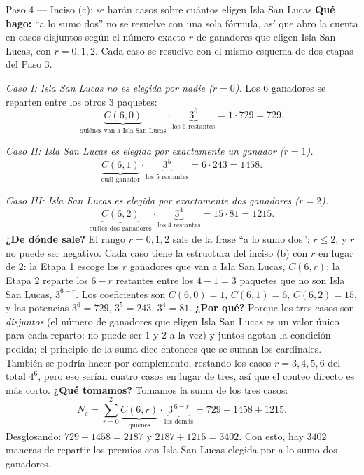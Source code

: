 \documentclass[11pt]{article}
\begin{document}
\begin{sol}
\begin{paso}{Paso 4 --- Inciso (c): se harán casos sobre cuántos eligen Isla San Lucas}
\textbf{Qué hago:} ``a lo sumo dos'' no se resuelve con una sola fórmula, así que abro la cuenta en casos disjuntos según el número exacto $r$ de ganadores que eligen Isla San Lucas, con $r=0,1,2$. Cada caso se resuelve con el mismo esquema de dos etapas del Paso 3.

\medskip
\emph{Caso I: Isla San Lucas no es elegida por nadie ($r=0$).} Los $6$ ganadores se reparten entre los otros $3$ paquetes:
\[
\underbrace{C(6,0)}_{\text{quiénes van a Isla San Lucas}}\cdot\underbrace{3^{6}}_{\text{los 6 restantes}}=1\cdot 729=729 .
\]

\medskip
\emph{Caso II: Isla San Lucas es elegida por exactamente un ganador ($r=1$).}
\[
\underbrace{C(6,1)}_{\text{cuál ganador}}\cdot\underbrace{3^{5}}_{\text{los 5 restantes}}=6\cdot 243=1458 .
\]

\medskip
\emph{Caso III: Isla San Lucas es elegida por exactamente dos ganadores ($r=2$).}
\[
\underbrace{C(6,2)}_{\text{cuáles dos ganadores}}\cdot\underbrace{3^{4}}_{\text{los 4 restantes}}=15\cdot 81=1215 .
\]
\textbf{¿De dónde sale?} El rango $r=0,1,2$ sale de la frase ``a lo sumo dos'': $r\le 2$, y $r$ no puede ser negativo. Cada caso tiene la estructura del inciso (b) con $r$ en lugar de $2$: la Etapa 1 escoge los $r$ ganadores que van a Isla San Lucas, $C(6,r)$; la Etapa 2 reparte los $6-r$ restantes entre los $4-1=3$ paquetes que no son Isla San Lucas, $3^{6-r}$. Los coeficientes son $C(6,0)=1$, $C(6,1)=6$, $C(6,2)=15$, y las potencias $3^6=729$, $3^5=243$, $3^4=81$.
\textbf{¿Por qué?} Porque los tres casos son \emph{disjuntos} (el número de ganadores que eligen Isla San Lucas es un valor único para cada reparto: no puede ser $1$ y $2$ a la vez) y juntos agotan la condición pedida; el principio de la suma dice entonces que se suman los cardinales. También se podría hacer por complemento, restando los casos $r=3,4,5,6$ del total $4^6$, pero eso serían cuatro casos en lugar de tres, así que el conteo directo es más corto.
\textbf{¿Qué tomamos?} Tomamos la suma de los tres casos:
\[
N_c=\sum_{r=0}^{2}\underbrace{C(6,r)}_{\text{quiénes}}\cdot\underbrace{3^{\,6-r}}_{\text{los demás}}=729+1458+1215 .
\]
Desglosando: $729+1458=2187$ y $2187+1215=3402$. Con esto, hay $3402$ maneras de repartir los premios con Isla San Lucas elegida por a lo sumo dos ganadores.
\end{paso}


\end{sol}
\end{document}
